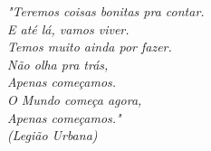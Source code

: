 \begin{epigrafe}
    \vspace*{\fill}
	\begin{flushright}

	  
	  \textit{"Teremos coisas bonitas pra contar. \\
	  E até lá, vamos viver. \\
	  Temos muito ainda por fazer. \\
	  Não olha pra trás, \\
	  Apenas começamos. \\
	  O Mundo começa agora, \\
	  Apenas começamos." \\
	     (Legião Urbana)
	  }
	  
	
	


 
 
  

	\end{flushright}
\end{epigrafe}
